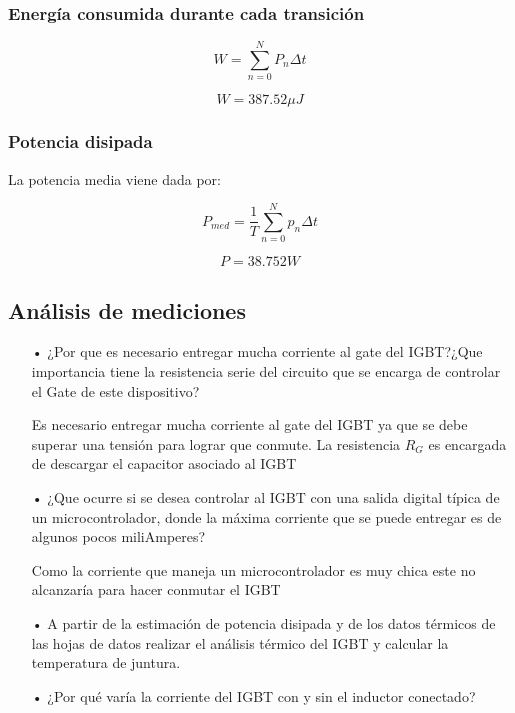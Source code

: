 \documentclass[a4paper,10pt]{article}
\begin{document}
\subsubsection*{Energía consumida durante cada transición}

\begin{equation}
W = \sum_{n=0}^N P_n \Delta t
\end{equation}

\begin{equation}
	W = 387.52  \unit{\mu J}
\end{equation}
\subsubsection*{Potencia disipada}

La potencia media viene dada por:

\begin{equation}
P_{med} = \frac{1}{T} \sum_{n=0}^N p_n \Delta t
\end{equation}

\begin{equation}
	P = 38.752 \unit{W} 
\end{equation}

\subsection{Análisis de mediciones}

\begin{enumerate}
	\item[•] ¿Por que es necesario entregar mucha corriente al gate del IGBT?¿Que importancia tiene la resistencia serie del circuito que se encarga de controlar el Gate de este dispositivo?
	
	Es necesario entregar mucha corriente al gate del IGBT ya que se debe superar una tensión para lograr que conmute.
	La resistencia $R_G$ es encargada de descargar el capacitor asociado al IGBT
	
	\item[•]	 ¿Que ocurre si se desea controlar al IGBT con una salida digital típica de un microcontrolador, donde la máxima corriente que se puede entregar es de algunos pocos miliAmperes?
	
	Como la corriente que maneja un microcontrolador es muy chica este no alcanzaría para hacer conmutar el IGBT
	
	\item[•] A partir de la estimación de potencia disipada y de los datos térmicos de las hojas de datos realizar el análisis térmico del IGBT y calcular la temperatura de juntura.
	
	\item[•] ¿Por qué varía la corriente del IGBT con y sin el inductor conectado?
	
\end{enumerate}
\end{document}
